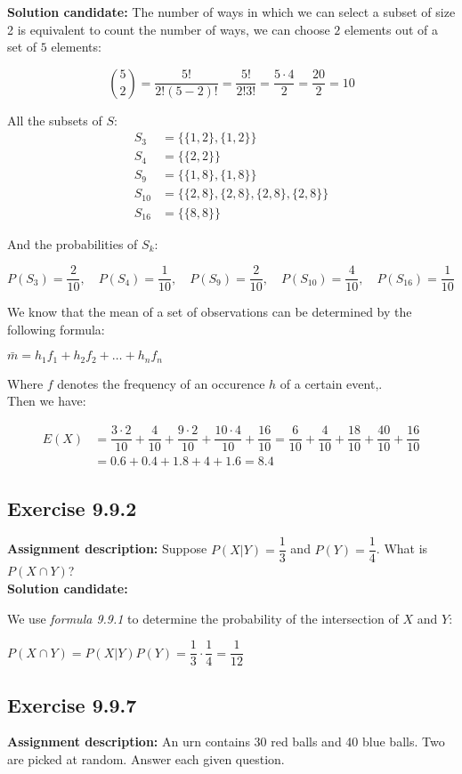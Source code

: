 \documentclass{report}
\newcommand{\cent}[1]{\begin{center}#1\end{center}}
\newcommand{\mAlign}[1]{\begin{align*}#1\end{align*}}
\newcommand{\AssignmentDescription}{\textbf{Assignment description: }}
\newcommand{\Solution}{\textbf{Solution candidate: }}
\newcommand{\QED}{\boxed{}}
\newcommand{\Exercise}[1]{\subsection{Exercise #1}}
\newcommand{\Formula}[1]{\textit{formula #1}}
\begin{document}
 	\Solution
 	The number of ways in which we can select a subset of size 2 is equivalent to count the number of ways, we can choose $2$ elements out of a set of $5$ elements:
 	
 	\cent{$$\binom{5}{2} = \dfrac{5!}{2!(5-2)!} = \dfrac{5!}{2!3!} = \dfrac{5 \cdot 4}{2} = \dfrac{20}{2} = 10$$}
 	
 	All the subsets of $S$:
 	\mAlign{
 		S_3 &=  \{\{1,2\},\{1,2\}\} \\
 		S_4 &= \{\{2,2\}\} \\
 		S_9 &= \{\{1,8\},\{1,8\}\} \\
 		S_{10} &= \{\{2,8\},\{2,8\},\{2,8\},\{2,8\}\} \\
 		S_{16} &= \{\{8,8\}\}
 	}
 	
 	And the probabilities of $S_k$:
 	
 	\cent{$P(S_3) = \dfrac{2}{10}, \quad P(S_4) = \dfrac{1}{10}, \quad P(S_9) = \dfrac{2}{10}, \quad P(S_{10}) = \dfrac{4}{10}, \quad P(S_{16}) = \dfrac{1}{10}$}
 
 	We know that the mean of a set of observations can be determined by the following formula:
 	
 	\cent{$\bar{m} = h_1 f_1 + h_2 f_2 + \dots + h_n f_n$}
 	
 	Where $f$ denotes the frequency of an occurence $h$ of a certain event,.\\
 	
 	Then we have:
 	
 	\mAlign{
 		E(X) &=\dfrac{3 \cdot 2}{10} + \dfrac{4}{10} + \dfrac{9 \cdot 2}{10} + \dfrac{10 \cdot 4}{10} + \dfrac{16}{10} = \dfrac{6}{10} + \dfrac{4}{10} + \dfrac{18}{10} + \dfrac{40}{10} + \dfrac{16}{10} \\
 		&= 0.6 + 0.4 + 1.8+ 4 + 1.6 =  8.4
 	}
 	\QED
 	
 	\Exercise{9.9.2}
 	\AssignmentDescription
 	Suppose $P(X|Y) = \dfrac{1}{3}$ and $P(Y) = \dfrac{1}{4}$. What is $P(X \cap Y)$?\\
 	
 	\Solution
 	
 	We use \Formula{9.9.1} to determine the probability of the intersection of $X$ and $Y$:
 	
 	\cent{$P(X \cap Y) = P(X|Y) P(Y) = \dfrac{1}{3} \cdot \dfrac{1}{4} = \dfrac{1}{12}$}
 	
 	\QED
 	
 	\Exercise{9.9.7}
 	\AssignmentDescription
 	An urn contains 30 red balls and 40 blue balls. Two are picked at random. Answer each given question.\\
 	
\end{document}
